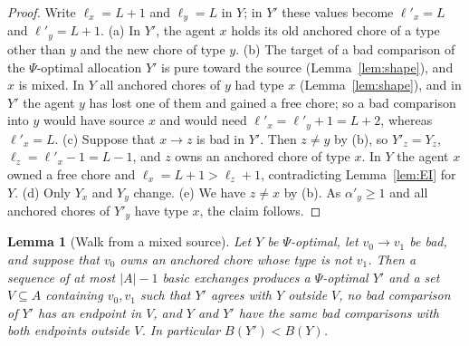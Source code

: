 \documentclass{amsart}
\numberwithin{equation}{section}
\newtheorem{lemma}[theorem]{Lemma}
\theoremstyle{definition}
\theoremstyle{remark}
\begin{document}
\begin{proof}
Write $\ell_x=L+1$ and $\ell_y=L$ in $Y$; in $Y'$ these values become $\ell'_x=L$ and $\ell'_y=L+1$.
(a) In $Y'$, the agent $x$ holds its old anchored chore of a type other than $y$ and the new chore of type $y$.
(b) The target of a bad comparison of the $\Psi$-optimal allocation $Y'$ is pure toward the source (Lemma~\ref{lem:shape}), and $x$ is mixed. In $Y$ all anchored chores of $y$ had type $x$ (Lemma~\ref{lem:shape}), and in $Y'$ the agent $y$ has lost one of them and gained a free chore; so a bad comparison into $y$ would have source $x$ and would need $\ell'_x=\ell'_y+1=L+2$, whereas $\ell'_x=L$.
(c) Suppose that $x\to z$ is bad in $Y'$. Then $z\ne y$ by (b), so $Y'_z=Y_z$, $\ell_z=\ell'_x-1=L-1$, and $z$ owns an anchored chore of type $x$. In $Y$ the agent $x$ owned a free chore and $\ell_x=L+1>\ell_z+1$, contradicting Lemma~\ref{lem:EI} for $Y$.
(d) Only $Y_x$ and $Y_y$ change.
(e) We have $z\ne x$ by (b). As $\alpha'_y\ge1$ and all anchored chores of $Y'_y$ have type $x$, the claim follows.
\end{proof}

\begin{lemma}[Walk from a mixed source]\label{lem:walk}
Let $Y$ be $\Psi$-optimal, let $v_0\to v_1$ be bad, and suppose that $v_0$ owns an anchored chore whose type is not $v_1$. Then a sequence of at most $|A|-1$ basic exchanges produces a $\Psi$-optimal $Y'$ and a set $V\subseteq A$ containing $v_0,v_1$ such that $Y'$ agrees with $Y$ outside $V$, no bad comparison of $Y'$ has an endpoint in $V$, and $Y$ and $Y'$ have the same bad comparisons with both endpoints outside $V$. In particular $B(Y')<B(Y)$.
\end{lemma}
\end{document}
